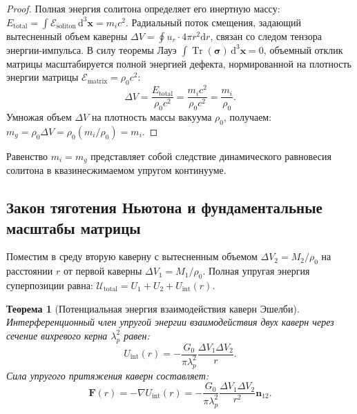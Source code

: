 \documentclass[11pt,a4paper]{article}
\newtheorem{theorem}{Теорема}
\theoremstyle{definition}
\theoremstyle{remark}
\begin{document}
\begin{proof}
Полная энергия солитона определяет его инертную массу: $E_{\mathrm{total}} = \int \mathcal{E}_{\mathrm{soliton}} \, \mathrm{d}^3\mathbf{x} = m_i c^2$. Радиальный поток смещения, задающий вытесненный объем каверны $\Delta V = \oint u_r \cdot 4\pi r^2 \mathrm{d}r$, связан со следом тензора энергии-импульса. В силу теоремы Лауэ $\int \operatorname{Tr}(\boldsymbol{\sigma}) \, \mathrm{d}^3\mathbf{x} = 0$, объемный отклик матрицы масштабируется полной энергией дефекта, нормированной на плотность энергии матрицы $\mathcal{E}_{\mathrm{matrix}} = \rho_0 c^2$:
\begin{equation}
\Delta V = \frac{E_{\mathrm{total}}}{\rho_0 c^2} = \frac{m_i c^2}{\rho_0 c^2} = \frac{m_i}{\rho_0}.
\end{equation}
Умножая объем $\Delta V$ на плотность массы вакуума $\rho_0$, получаем: $m_g = \rho_0 \Delta V = \rho_0 (m_i / \rho_0) = m_i$.
\end{proof}
Равенство $m_i = m_g$ представляет собой следствие динамического равновесия солитона в квазинесжимаемом упругом континууме.

\subsection{Закон тяготения Ньютона и фундаментальные масштабы матрицы}

Поместим в среду вторую каверну с вытесненным объемом $\Delta V_2 = M_2 / \rho_0$ на расстоянии $r$ от первой каверны $\Delta V_1 = M_1 / \rho_0$.
Полная упругая энергия суперпозиции равна: $\mathcal{U}_{\mathrm{total}} = U_1 + U_2 + U_{\mathrm{int}}(r)$.

\begin{theorem}[Потенциальная энергия взаимодействия каверн Эшелби]
\label{thm:eshelby_newton_force}
Интерференционный член упругой энергии взаимодействия двух каверн через сечение вихревого керна $\lambda_p^2$ равен:
\begin{equation}
	U_{\mathrm{int}}(r) = -\frac{G_0}{\pi \lambda_p^2} \frac{\Delta V_1 \Delta V_2}{r}.
\label{eq:eshelby_potential_formula}
\end{equation}
Сила упругого притяжения каверн составляет:
\begin{equation}
	\mathbf{F}(r) = -\nabla U_{\mathrm{int}}(r) = -\frac{G_0}{\pi \lambda_p^2} \frac{\Delta V_1 \Delta V_2}{r^2} \mathbf{n}_{12}.
\label{eq:eshelby_force_formula}
\end{equation}
\end{theorem}
\end{document}
